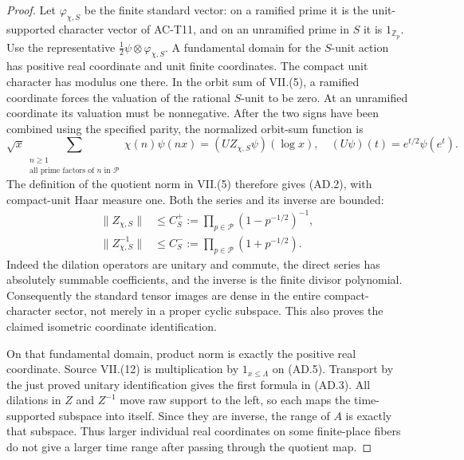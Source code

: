 \begin{proof}
Let \(\varphi_{\chi,S}\) be the finite standard vector:
on a ramified prime it is the unit-supported character
vector of AC-T11, and on an unramified prime in \(S\)
it is \(1_{\mathbb Z_p}\).
Use the representative
\(\frac12\psi\otimes\varphi_{\chi,S}\).
A fundamental domain for the \(S\)-unit action has
positive real coordinate and unit finite coordinates.
The compact unit character has modulus one there.
In the orbit sum of VII.(5), a ramified coordinate
forces the valuation of the rational \(S\)-unit
to be zero.  At an unramified coordinate its
valuation must be nonnegative.
After the two signs have been combined using the
specified parity, the normalized orbit-sum function is
\[
 \sqrt{x}\sum_{\substack{n\geq1\\
                   \text{all prime factors of }n\text{ in }\mathcal P}}
                     \chi(n)\psi(nx)
                       =(UZ_{\chi,S}\psi)(\log x),
 \quad (U\psi)(t)=e^{t/2}\psi(e^t).
 \tag{AD.5}
\]
The definition of the quotient norm in VII.(5)
therefore gives (AD.2), with compact-unit Haar
measure one.
Both the series and its inverse are bounded:
\[
 \begin{split}
 \|Z_{\chi,S}\|&\leq
                  C_S^+:=\prod_{p\in\mathcal P}(1-p^{-1/2})^{-1},\\
 \|Z_{\chi,S}^{-1}\|&\leq
                  C_S^-:=\prod_{p\in\mathcal P}(1+p^{-1/2}).
 \end{split}
 \tag{AD.6}
\]
Indeed the dilation operators are unitary and commute,
the direct series has absolutely summable coefficients,
and the inverse is the finite divisor polynomial.
Consequently the standard tensor images are dense
in the entire compact-character sector, not merely
in a proper cyclic subspace.  This also proves the
claimed isometric coordinate identification.

On that fundamental domain, product norm is exactly
the positive real coordinate.  Source VII.(12)
is multiplication by \(1_{x\leq\Lambda}\) on (AD.5).
Transport by the just proved unitary identification
gives the first formula in (AD.3).
All dilations in \(Z\) and \(Z^{-1}\) move raw
support to the left, so each maps the time-supported
subspace into itself.  Since they are inverse,
the range of \(A\) is exactly that subspace.
Thus larger individual real coordinates on some
finite-place fibers do not give a larger time
range after passing through the quotient map.


\end{proof}
